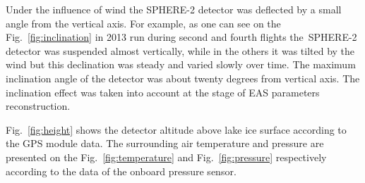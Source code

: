 \documentclass[final,5p,times,twocolumn]{elsarticle}
\begin{document}
Under the influence of wind the SPHERE-2 detector was deflected by a small angle from the vertical axis. For example, as one can see on the Fig.~\ref{fig:inclination} in 2013 run during second and fourth flights the~\mbox{SPHERE-2} detector was suspended almost vertically, while in the others it was tilted by the wind but this declination was steady and varied slowly over time. The maximum inclination angle of the detector was about twenty degrees from vertical axis. The inclination effect was taken into account at the stage of EAS parameters reconstruction.

Fig.~\ref{fig:height} shows the detector altitude above lake ice surface according to the GPS module data. The surrounding air temperature and pressure are presented on the Fig.~\ref{fig:temperature} and Fig.~\ref{fig:pressure} respectively according to the data of the onboard pressure sensor.
\end{document}
